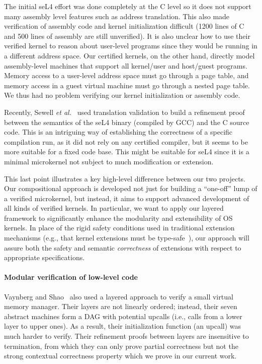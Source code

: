 The initial seL4 effort was done completely at the C level so it does
not support many assembly level features such as address translation.
This also made verification of assembly code and kernel initialization
difficult (1200 lines of C and 500 lines of assembly are still
unverified). It is also unclear how to use their verified kernel
to reason about user-level programs since they would be running in a
different address space. Our certified kernels, on the other hand,
directly model assembly-level machines that support all kernel/user
and host/guest programs. Memory access to a user-level address space
must go through a page table, and memory access in a guest virtual
machine must go through a nested page table. We thus had no problem
verifying our kernel initialization or assembly code.


Recently, Sewell {\em et al.}~\cite{sewell13} used translation
validation to build a refinement proof between the
semantics of the seL4 binary (compiled by GCC) and the C source
code. This is an intriguing way of establishing the correctness of a
specific compilation run, as it did not rely on any certified
compiler, but it seems to be more suitable for a fixed code base. 
This might be suitable for seL4 since it is a minimal microkernel
not subject to much modification or extension.

This last point illustrates a key high-level difference between our
two projects. Our compositional approach is developed not just for
building a ``one-off'' lump of a verified microkernel, but instead, it
aims to support advanced development of all kinds of verified kernels.
In particular, we want to apply our layered framework to significantly
enhance the modularity and extensibility of OS kernels.  In place of
the rigid safety conditions used in traditional extension mechanisms
(e.g., that kernel extensions must be
type-safe~\cite{bershad95,hunt07}), our approach will assure both the
safety and semantic {\em correctness} of extensions with respect to
appropriate specifications.


\paragraph{Modular verification of low-level code} 
Vaynberg and Shao~\cite{vaynberg12} also used a layered approach to
verify a small virtual memory manager. Their layers are not linearly
ordered; instead, their seven abstract machines form a DAG with
potential upcalls (i.e., calls from a lower layer to upper ones). As a
result, their initialization function (an upcall) was much harder to
verify. Their refinement proofs between layers are insensitive to
termination, from which they can only prove partial correctness but
not the strong contextual correctness property which we prove in our
current work.

